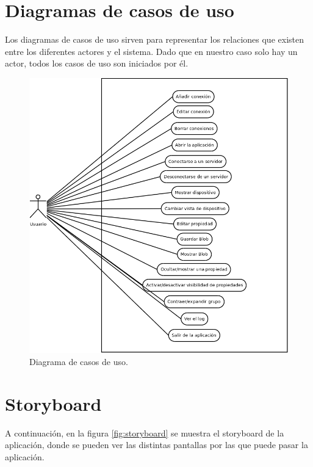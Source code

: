 \newpage
\section{Diagramas de casos de uso}

Los diagramas de casos de uso sirven para representar los relaciones que existen entre los diferentes actores y el sistema. Dado que en nuestro caso solo hay un actor, todos los casos de uso son iniciados por él.

\bigskip

\begin{figure}[!ht]
  \begin{center}
  \includegraphics[width=1\textwidth]{../images/diagrama_casos_de_uso.png}
  \caption{Diagrama de casos de uso.}
  \label{fig:diag_scrum}
  \end{center}
\end{figure}

\newpage
\section{Storyboard}

A continuación, en la figura \ref{fig:storyboard} se muestra el storyboard de la aplicación, donde se pueden ver las distintas pantallas por las que puede pasar la aplicación.

